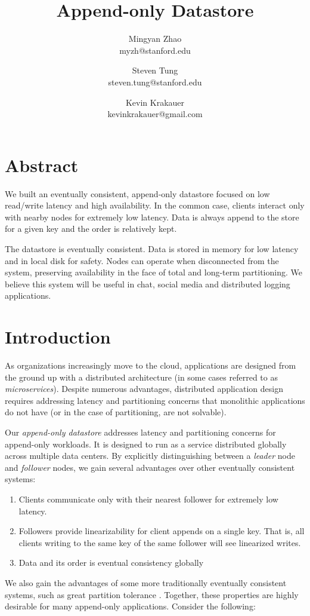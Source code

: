 \documentclass[11pt,english,twocolumn]{article}
\title{Append-only Datastore}
\author{
	Mingyan Zhao \\
    myzh@stanford.edu
	\and
	Steven Tung\\
    steven.tung@stanford.edu
	\and
	Kevin Krakauer\\
    kevinkrakauer@gmail.com
}
\date{}
\begin{document}
\maketitle


\section*{Abstract}
We built an eventually consistent, append-only datastore focused on low
read/write latency and high availability. In the common case, clients interact
only with nearby nodes for extremely low latency. Data is always append to the 
store for a given key and the order is relatively kept.

The datastore is eventually consistent. Data is stored in memory for low latency
and in local disk for safety. Nodes can operate when disconnected from the
system, preserving availability in the face of total and long-term partitioning.
We believe this system will be useful in chat, social media and distributed logging
applications.

\vspace{-0.4cm}
\section{Introduction}
\vspace{-0.2cm}
As organizations increasingly move to the cloud, applications are designed from
the ground up with a distributed architecture (in some cases referred to as
\textit{microservices}). Despite numerous advantages, distributed
application design requires addressing latency and partitioning concerns that
monolithic applications do not have (or in the case of partitioning, are not
solvable).

Our \textit{append-only datastore} addresses latency and partitioning concerns
for append-only workloads. It is designed to run as a service distributed
globally across multiple data centers. By explicitly distinguishing between a
\textit{leader} node and \textit{follower} nodes, we gain several advantages
over other eventually consistent systems:
\begin{enumerate}
	\item Clients communicate only with their nearest follower for extremely
		low latency. \vspace{-0.3cm}
	\item Followers provide linearizability for client appends on a single
		key. That is, all clients writing to the same key of the same
		follower will see linearized writes.\vspace{-0.3cm}
	\item Data and its order is eventual consistency globally
\end{enumerate}
We also gain the advantages of some more traditionally eventually consistent
systems, such as great partition tolerance \cite{Dynamo}. Together, these
properties are highly desirable for many append-only applications. Consider the
following:
\end{document}
